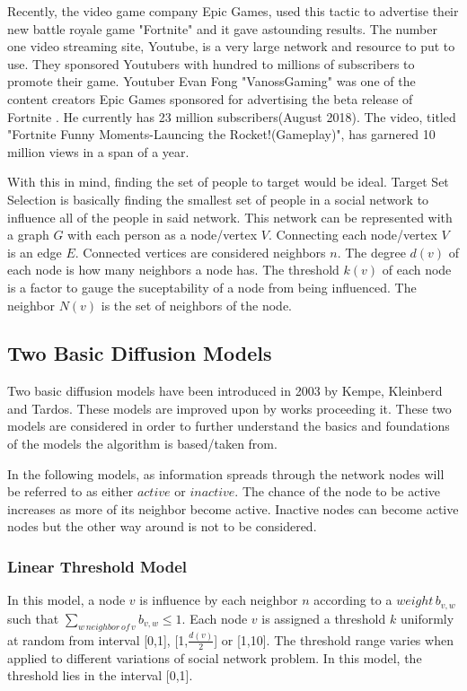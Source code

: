 Recently, the video game company Epic Games, used this tactic to advertise their new battle royale game "Fortnite" and it gave astounding results. The number one video streaming site, Youtube, is a very large network and resource to put to use. They sponsored Youtubers with hundred to millions of subscribers to promote their game.\cite{sponsoredvideos} Youtuber Evan Fong "VanossGaming" was one of the content creators Epic Games sponsored for advertising the beta release of Fortnite \cite{vanoss}. He currently has 23 million subscribers(August 2018). The video, titled "Fortnite Funny Moments-Launcing the Rocket!(Gameplay)", has garnered 10 million views in a span of a year.

With this in mind, finding the set of people to target would be ideal. Target Set Selection is basically finding the smallest set of people in a social network to influence all of the people in said network.\cite{Kempe,chen,Shakarian:2012:LSN:2456719.2457081} This network can be represented with a graph $G$ with each person as a node/vertex $V$. Connecting each node/vertex $V$ is an edge $E$. Connected vertices are considered neighbors $n$. The degree $d(v)$ of each node is how many neighbors a node has. The threshold $k(v)$ of each node is a factor to gauge the suceptability of a node from being influenced. The neighbor $N(v)$ is the set of neighbors of the node. 

\subsection{Two Basic Diffusion Models}
Two basic diffusion models have been introduced in 2003 by Kempe, Kleinberd and Tardos.\cite{Kempe} These models are improved upon by works proceeding it. These two models are considered in order to further understand the basics and foundations of the models the algorithm is based/taken from.


In the following models, as information spreads through the network nodes will be referred to as either $active$ or $inactive$. The chance of the node to be active increases as more of its neighbor become active. Inactive nodes can become active nodes but the other way around is not to be considered. 
\subsubsection{Linear Threshold Model}
In this model, a node $v$ is influence by each neighbor $n$ according to a $weight\, b_{v,w}$ such that $\sum_{w\, neighbor\, of\, v} b_{v,w}\leq{1}$.\cite{Kempe} Each node $v$ is assigned a threshold $k$ uniformly at random from interval [0,1], [1,$\frac{d(v)}{2}$] or [1,10].\cite{chen} The threshold range varies when applied to different variations of social network problem. In this model, the threshold lies in the interval [0,1]. 

